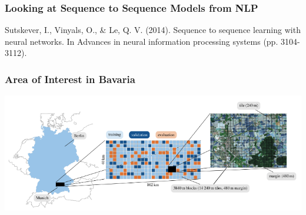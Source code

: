 
\begin{frame}[t]
\frametitle{Looking at Sequence to Sequence Models from NLP}

\begin{center}
	
\end{center}
%	
%	


{\small
	Sutskever, I., Vinyals, O., \& Le, Q. V. (2014). Sequence to sequence learning with neural networks. In Advances in neural information processing systems (pp. 3104-3112).}


\end{frame}

\begin{frame}
\frametitle{Area of Interest in Bavaria}
\includegraphics[width=\textwidth]{images/aoi}
%
\end{frame}


